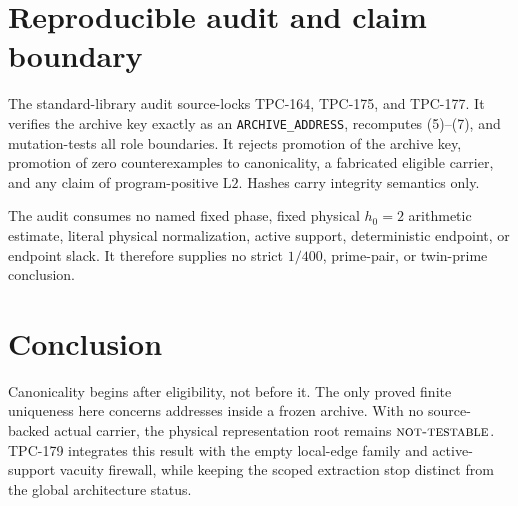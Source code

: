 \documentclass[11pt]{article}
\theoremstyle{definition}
\theoremstyle{remark}
\newcommand{\Ltwo}{\mathrm{L2}}
\newcommand{\NT}{\textnormal{\textsc{not-testable}}}
\begin{document}
\section{Reproducible audit and claim boundary}

The standard-library audit source-locks TPC-164, TPC-175, and
TPC-177.  It verifies the archive key exactly as an
\texttt{ARCHIVE\_ADDRESS}, recomputes (5)--(7), and mutation-tests
all role boundaries.  It rejects promotion of the archive key,
promotion of zero counterexamples to canonicality, a fabricated
eligible carrier, and any claim of program-positive \(\Ltwo\).
Hashes carry integrity semantics only.

The audit consumes no named fixed phase, fixed physical \(h_0=2\)
arithmetic estimate, literal physical normalization, active support,
deterministic endpoint, or endpoint slack.  It therefore supplies no
strict \(1/400\), prime-pair, or twin-prime conclusion.

\section{Conclusion}

Canonicality begins after eligibility, not before it.  The only
proved finite uniqueness here concerns addresses inside a frozen
archive.  With no source-backed actual carrier, the physical
representation root remains \(\NT\).  TPC-179 integrates this result
with the empty local-edge family and active-support vacuity firewall,
while keeping the scoped extraction stop distinct from the global
architecture status.

\nocite{*}


\end{document}

